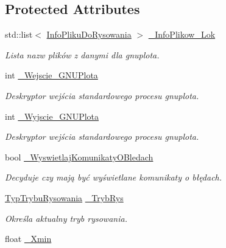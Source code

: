 \subsection*{Protected Attributes}
\begin{DoxyCompactItemize}
\item 
std\+::list$<$ \mbox{\hyperlink{class_pz_g_1_1_info_pliku_do_rysowania}{Info\+Pliku\+Do\+Rysowania}} $>$ \mbox{\hyperlink{class_pz_g_1_1_lacze_do_g_n_u_plota_abb57c6afa7e391036b0ad9ef3e454913}{\+\_\+\+Info\+Plikow\+\_\+\+Lok}}
\begin{DoxyCompactList}\small\item\em Lista nazw plików z danymi dla {\itshape gnuplota}. \end{DoxyCompactList}\item 
int \mbox{\hyperlink{class_pz_g_1_1_lacze_do_g_n_u_plota_adc3a2250216c2473a61da379da70b2d7}{\+\_\+\+Wejscie\+\_\+\+G\+N\+U\+Plota}}
\begin{DoxyCompactList}\small\item\em Deskryptor wejścia standardowego procesu gnuplota. \end{DoxyCompactList}\item 
int \mbox{\hyperlink{class_pz_g_1_1_lacze_do_g_n_u_plota_a7d05a4767a35ee494d59724bb740dbc2}{\+\_\+\+Wyjscie\+\_\+\+G\+N\+U\+Plota}}
\begin{DoxyCompactList}\small\item\em Deskryptor wejścia standardowego procesu gnuplota. \end{DoxyCompactList}\item 
bool \mbox{\hyperlink{class_pz_g_1_1_lacze_do_g_n_u_plota_a2f2800f14ebfe1caef0b4d30c410a7fe}{\+\_\+\+Wyswietlaj\+Komunikaty\+O\+Bledach}}
\begin{DoxyCompactList}\small\item\em Decyduje czy mają być wyświetlane komunikaty o błędach. \end{DoxyCompactList}\item 
\mbox{\hyperlink{namespace_pz_g_aef59d70a0ee2eab473790613c3628944}{Typ\+Trybu\+Rysowania}} \mbox{\hyperlink{class_pz_g_1_1_lacze_do_g_n_u_plota_a7d9bde70af80b5224c5771f4768a9bab}{\+\_\+\+Tryb\+Rys}}
\begin{DoxyCompactList}\small\item\em Określa aktualny tryb rysowania. \end{DoxyCompactList}\item 
float \mbox{\hyperlink{class_pz_g_1_1_lacze_do_g_n_u_plota_a69d530edfe769e38448972e897456deb}{\+\_\+\+Xmin}}

\end{DoxyCompactItemize}
